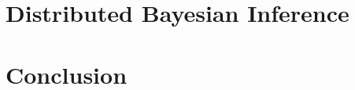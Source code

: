 \ifpbp\fi

\chapter{Distributed Bayesian Inference}

\ifsnep\fi

\chapter{Conclusion}




\appendix{}




\newpage
\renewcommand{\bibname}{References}

\begin{footnotesize}

\end{footnotesize}

